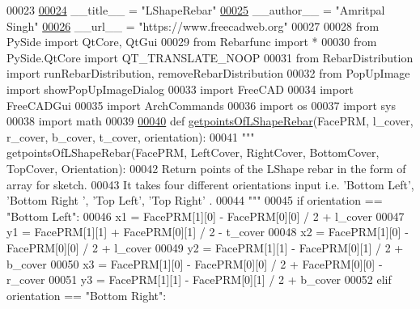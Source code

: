 \begin{DoxyCode}
00023 
\hypertarget{LShapeRebar_8py_source.tex_l00024}{}\hyperlink{namespaceLShapeRebar_a0ac8e9cb97e560c6ce362c1ac5144c31}{00024} \_\_title\_\_ = \textcolor{stringliteral}{"LShapeRebar"}
\hypertarget{LShapeRebar_8py_source.tex_l00025}{}\hyperlink{namespaceLShapeRebar_ad398517c2df8a455dfd0b670e54285ea}{00025} \_\_author\_\_ = \textcolor{stringliteral}{"Amritpal Singh"}
\hypertarget{LShapeRebar_8py_source.tex_l00026}{}\hyperlink{namespaceLShapeRebar_a7bca929f0dda68928d1f3978b4e877f8}{00026} \_\_url\_\_ = \textcolor{stringliteral}{"https://www.freecadweb.org"}
00027 
00028 \textcolor{keyword}{from} PySide \textcolor{keyword}{import} QtCore, QtGui
00029 \textcolor{keyword}{from} Rebarfunc \textcolor{keyword}{import} *
00030 \textcolor{keyword}{from} PySide.QtCore \textcolor{keyword}{import} QT\_TRANSLATE\_NOOP
00031 \textcolor{keyword}{from} RebarDistribution \textcolor{keyword}{import} runRebarDistribution, removeRebarDistribution
00032 \textcolor{keyword}{from} PopUpImage \textcolor{keyword}{import} showPopUpImageDialog
00033 \textcolor{keyword}{import} FreeCAD
00034 \textcolor{keyword}{import} FreeCADGui
00035 \textcolor{keyword}{import} ArchCommands
00036 \textcolor{keyword}{import} os
00037 \textcolor{keyword}{import} sys
00038 \textcolor{keyword}{import} math
00039 
\hypertarget{LShapeRebar_8py_source.tex_l00040}{}\hyperlink{namespaceLShapeRebar_a3019960c6f6476cb70df9ee06f330dfb}{00040} \textcolor{keyword}{def }\hyperlink{namespaceLShapeRebar_a3019960c6f6476cb70df9ee06f330dfb}{getpointsOfLShapeRebar}(FacePRM, l\_cover, r\_cover, b\_cover, t\_cover, orientation):
00041     \textcolor{stringliteral}{""" getpointsOfLShapeRebar(FacePRM, LeftCover, RightCover, BottomCover, TopCover, Orientation):}
00042 \textcolor{stringliteral}{    Return points of the LShape rebar in the form of array for sketch.}
00043 \textcolor{stringliteral}{    It takes four different orientations input i.e. 'Bottom Left', 'Bottom Right ', 'Top Left', 'Top Right'
      .}
00044 \textcolor{stringliteral}{    """}
00045     \textcolor{keywordflow}{if} orientation == \textcolor{stringliteral}{"Bottom Left"}:
00046         x1 = FacePRM[1][0] - FacePRM[0][0] / 2 + l\_cover
00047         y1 = FacePRM[1][1] + FacePRM[0][1] / 2 - t\_cover
00048         x2 = FacePRM[1][0] - FacePRM[0][0] / 2 + l\_cover
00049         y2 = FacePRM[1][1] - FacePRM[0][1] / 2 + b\_cover
00050         x3 = FacePRM[1][0] - FacePRM[0][0] / 2 + FacePRM[0][0] - r\_cover
00051         y3 = FacePRM[1][1] - FacePRM[0][1] / 2 + b\_cover
00052     \textcolor{keywordflow}{elif} orientation == \textcolor{stringliteral}{"Bottom Right"}:

\end{DoxyCode}
